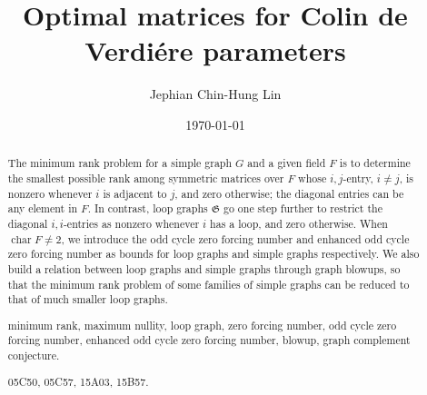 \documentclass{article}
\def \Fchar {\operatorname{char}}
\def \mfkG{\mathfrak{G}}
\begin{document}
\title{Optimal matrices for Colin de Verdi\'ere parameters}

\author{
        Jephian Chin-Hung Lin\footnotemark[2]
        }

\date{\today}


\maketitle

\renewcommand{\thefootnote}{\fnsymbol{footnote}}
        
\renewcommand{\thefootnote}{\arabic{footnote}}

\begin{abstract}
The minimum rank problem for a simple graph $G$ and a given field $F$ is to determine the smallest possible rank among symmetric matrices over $F$ whose $i,j$-entry, $i\neq j$, is nonzero whenever $i$ is adjacent to $j$, and zero otherwise; the diagonal entries can be any element in $F$.  In contrast, loop graphs $\mfkG$ go one step further to restrict the diagonal $i,i$-entries as nonzero whenever $i$ has a loop, and zero otherwise.  When $\Fchar F\neq 2$, we introduce the odd cycle zero forcing number and enhanced odd cycle zero forcing number as bounds for loop graphs and simple graphs respectively.  We also build a relation between loop graphs and simple graphs through graph blowups, so that the minimum rank problem of some families of simple graphs can be reduced to that of much smaller loop graphs.

minimum rank, maximum nullity, loop graph, zero forcing number, odd cycle zero forcing number, enhanced odd cycle zero forcing number, blowup, graph complement conjecture.

05C50, %
05C57, %
15A03, %
15B57. %
\end{abstract}



{}


%
\end{document}
